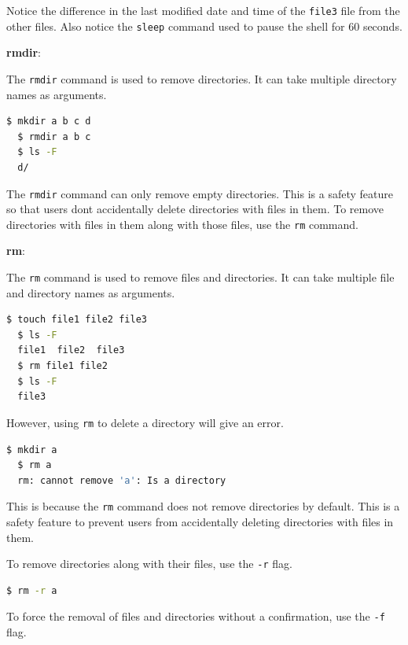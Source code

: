 \begin{exercise}
  Notice the difference in the last modified date and time of the \texttt{file3} file from the other files.
  Also notice the \texttt{sleep} command used to pause the shell for 60 seconds.
\end{exercise}

\textbf{rmdir}:

The \texttt{rmdir} command is used to remove directories.
It can take multiple directory names as arguments.

\begin{lstlisting}[language=bash]
  $ mkdir a b c d
  $ rmdir a b c
  $ ls -F
  d/
\end{lstlisting}

\begin{remark}
  The \texttt{rmdir} command can only remove empty directories.
  This is a safety feature so that users dont accidentally delete directories with files in them.
  To remove directories with files in them along with those files, use the \texttt{rm} command.
\end{remark}

\textbf{rm}:

The \texttt{rm} command is used to remove files and directories.
It can take multiple file and directory names as arguments.

\begin{lstlisting}[language=bash]
  $ touch file1 file2 file3
  $ ls -F
  file1  file2  file3
  $ rm file1 file2
  $ ls -F
  file3
\end{lstlisting}

However, using \texttt{rm} to delete a directory will give an error.

\begin{lstlisting}[language=bash]
  $ mkdir a
  $ rm a
  rm: cannot remove 'a': Is a directory
\end{lstlisting}

This is because the \texttt{rm} command does not remove directories by default.
This is a safety feature to prevent users from accidentally deleting directories with files in them.

To remove directories along with their files, use the \texttt{-r} flag.

\begin{lstlisting}[language=bash]
  $ rm -r a
\end{lstlisting}

To force the removal of files and directories without a confirmation, use the \texttt{-f} flag.

